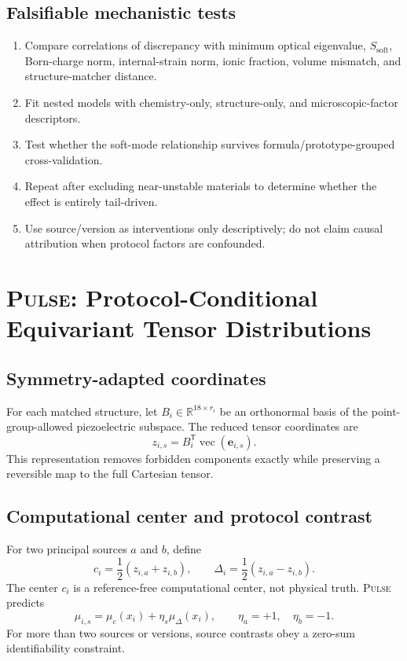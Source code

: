 \documentclass[11pt]{article}
\newcommand{\E}{\mathbf{e}}
\newcommand{\R}{\mathbb{R}}
\newcommand{\PULSE}{\textsc{Pulse}}
\newcommand{\vecop}{\operatorname{vec}}
\begin{document}
\subsection{Falsifiable mechanistic tests}

\begin{enumerate}[leftmargin=1.5em]
    \item Compare correlations of discrepancy with minimum optical eigenvalue, $S_{\mathrm{soft}}$, Born-charge norm, internal-strain norm, ionic fraction, volume mismatch, and structure-matcher distance.
    \item Fit nested models with chemistry-only, structure-only, and microscopic-factor descriptors.
    \item Test whether the soft-mode relationship survives formula/prototype-grouped cross-validation.
    \item Repeat after excluding near-unstable materials to determine whether the effect is entirely tail-driven.
    \item Use source/version as interventions only descriptively; do not claim causal attribution when protocol factors are confounded.
\end{enumerate}

\section{\PULSE: Protocol-Conditional Equivariant Tensor Distributions}

\subsection{Symmetry-adapted coordinates}

For each matched structure, let $B_i\in\R^{18\times r_i}$ be an orthonormal basis of the point-group-allowed piezoelectric subspace. The reduced tensor coordinates are
\begin{equation}
z_{i,s}=B_i^\mathsf{T}\vecop(\E_{i,s}).
\end{equation}
This representation removes forbidden components exactly while preserving a reversible map to the full Cartesian tensor.

\subsection{Computational center and protocol contrast}

For two principal sources $a$ and $b$, define
\begin{equation}
c_i=\frac{1}{2}(z_{i,a}+z_{i,b}),
\qquad
\Delta_i=\frac{1}{2}(z_{i,a}-z_{i,b}).
\end{equation}
The center $c_i$ is a reference-free computational center, not physical truth. \PULSE{} predicts
\begin{equation}
\mu_{i,s}
=
\mu_c(x_i)+\eta_s\mu_\Delta(x_i),
\qquad
\eta_a=+1,\quad \eta_b=-1.
\label{eq:pulsemean}
\end{equation}
For more than two sources or versions, source contrasts obey a zero-sum identifiability constraint.
\end{document}
